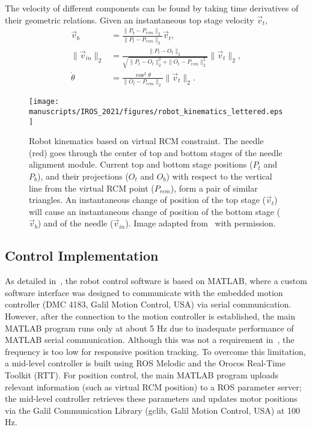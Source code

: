 The velocity of different components can be found by taking time derivatives of their geometric relations. Given an instantaneous top stage velocity $\vec{v}_t$,
\begin{align}
  \vec{v}_b &= \frac{\|P_b - P_{rcm}\|_2}{\|P_t - P_{rcm}\|_2} \vec{v}_t,\\
  \|\vec{v}_{in}\|_2 &= \frac{\|P_t - O_t\|_2}{\sqrt{\|P_t - O_t\|_2^2 + \|O_t - P_{rcm}\|_2^2}} \|\vec{v}_t\|_2,\\
  \dot\theta &= \frac{\cos^2{\theta}}{\|O_t - P_{rcm}\|_2} \|\vec{v}_t\|_2.
\end{align}



\begin{figure}[t]
  \centering
  \texttt{[image: manuscripts/IROS\_2021/figures/robot\_kinematics\_lettered.eps]}
  \caption{Robot kinematics based on virtual RCM constraint. The needle (red) goes through the center of top and bottom stages of the needle alignment module. Current top and bottom stage positions ($P_{t}$ and $P_{b}$), and their projections ($O_{t}$ and $O_{b}$) with respect to the vertical line from the virtual RCM point ($P_{rcm}$), form a pair of similar triangles. An instantaneous change of position of the top stage ($\vec{v}_{t}$) will cause an instantaneous change of position of the bottom stage ($\vec{v}_{b}$) and of the needle ($\vec{v}_{in}$). Image adapted from~\parencite{liFullyActuatedBodyMounted2020a} with permission.}
  \label{fig:robot_kinematics}
\end{figure}

\subsection{Control Implementation}
\label{sec:chap-2-control-implementation}

As detailed in~\parencite{liFullyActuatedBodyMounted2020a}, the robot control software is based on MATLAB, where a custom software interface was designed to communicate with the embedded motion controller (DMC 4183, Galil Motion Control, USA) via serial communication. However, after the connection to the motion controller is established, the main MATLAB program runs only at about 5 Hz due to inadequate performance of MATLAB serial communication. Although this was not a requirement in~\cite{liFullyActuatedBodyMounted2020a}, the frequency is too low for responsive position tracking. To overcome this limitation, a mid-level controller is built using ROS Melodic and the Orocos Real-Time Toolkit (RTT). For position control, the main MATLAB program uploads relevant information (such as virtual RCM position) to a ROS parameter server; the mid-level controller retrieves these parameters and updates motor positions via the Galil Communication Library (gclib, Galil Motion Control, USA) at 100 Hz.

